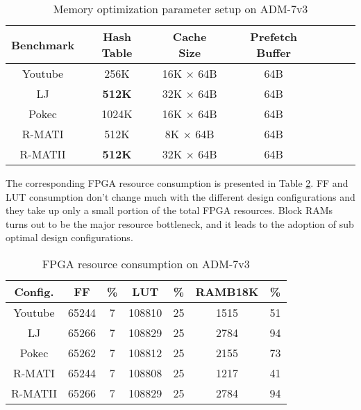 \begin{table}
  \vspace{-0.3em}
  \caption{Memory optimization parameter setup on ADM-7v3}
  \label{tab:parameter-setup}
    \centering
  \vspace{-0.3em}
  \begin{tabular}{ccccccc}
    \toprule
      Benchmark & Hash Table & Cache Size & Prefetch Buffer \\
    \midrule
      Youtube  & 256K  & 16K $\times$ 64B & 64B \\
      LJ       & \textbf{512K} & 32K $\times$ 64B & 64B \\
      Pokec    & 1024K & 16K $\times$ 64B & 64B \\
      R-MATI   & 512K  & 8K $\times$  64B & 64B \\
      R-MATII  & \textbf{512K} & 32K $\times$ 64B & 64B \\
  \bottomrule
\end{tabular}
\vspace{-1em}
\end{table}

The corresponding FPGA resource consumption is 
presented in Table \ref{tab:mem-resource}. 
FF and LUT consumption don't change much with the different 
design configurations and they take up only a small portion 
of the total FPGA resources. Block RAMs turns out to be the major 
resource bottleneck, and it leads to the adoption of sub optimal 
design configurations.

\begin{table}
  \vspace{-0.5em}
  \caption{FPGA resource consumption on ADM-7v3}
  \label{tab:mem-resource}
  \vspace{-0.3em}
    \centering
  \begin{tabular}{ccccccc}
    \toprule
      Config. & FF & \% & LUT & \% & RAMB18K & \% \\
    \midrule
      Youtube  & 65244 & 7 & 108810 & 25 & 1515  & 51 \\
      LJ       & 65266 & 7 & 108829 & 25 & 2784  & 94 \\
      Pokec    & 65262 & 7 & 108812 & 25 & 2155 & 73 \\
      R-MATI   & 65244 & 7 & 108808 & 25 & 1217 & 41 \\
      R-MATII  & 65266 & 7 & 108829 & 25 & 2784 & 94 \\
  \bottomrule
\end{tabular}
\vspace{-1em}
\end{table}

